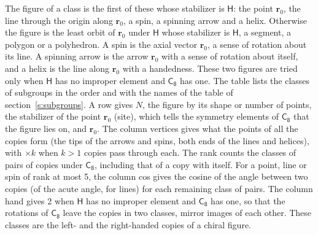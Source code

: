 \documentclass[10pt,a4paper]{article}
\numberwithin{equation}{section}
\newcommand{\grp}[1]{\mathsf{#1}}
\newcommand{\pointr}{\mathbf{r}}
\begin{document}
\leavevmode\label{n:head.figure}The figure of a class is the first of these whose stabilizer is $\grp{H}$: the point $\pointr_0$, the line through the origin along $\pointr_0$, a spin, a spinning arrow and a helix. Otherwise the figure is the least orbit of $\pointr_0$ under $\grp{H}$ whose stabilizer is $\grp{H}$, a segment, a polygon or a polyhedron. A spin is the axial vector $\pointr_0$, a sense of rotation about its line. A spinning arrow is the arrow $\pointr_0$ with a sense of rotation about itself, and a helix is the line along $\pointr_0$ with a handedness. These two figures are tried only when $\grp{H}$ has no improper element and $\grp{C_{8}}$ has one. The table lists the classes of subgroups in the order and with the names of the table of section~\ref{s:subgroups}. \label{n:head.site}A row gives $N$, the figure by its shape or number of points, the stabilizer of the point $\pointr_0$ (site), which tells the symmetry elements of $\grp{C_{8}}$ that the figure lies on, and $\pointr_0$. \label{n:head.vertices}The column vertices gives what the points of all the copies form (the tips of the arrows and spins, both ends of the lines and helices), with ${\times}k$ when $k > 1$ copies pass through each. \label{n:head.rank}The rank counts the classes of pairs of copies under $\grp{C_{8}}$, including that of a copy with itself. \label{n:head.cos}For a point, line or spin of rank at most 5, the column cos gives the cosine of the angle between two copies (of the acute angle, for lines) for each remaining class of pairs. \label{n:head.hand}The column hand gives 2 when $\grp{H}$ has no improper element and $\grp{C_{8}}$ has one, so that the rotations of $\grp{C_{8}}$ leave the copies in two classes, mirror images of each other. These classes are the left- and the right-handed copies of a chiral figure.
\end{document}
